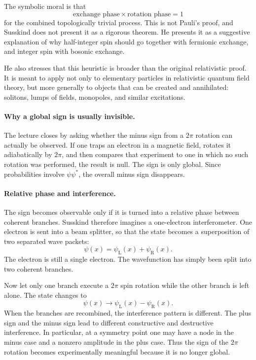 The symbolic moral is that
\begin{equation}
\text{exchange phase} \times \text{rotation phase} = 1
\end{equation}
for the combined topologically trivial process. This is not Pauli's proof, and Susskind does not present it as a rigorous theorem. He presents it as a suggestive explanation of why half-integer spin should go together with fermionic exchange, and integer spin with bosonic exchange.

He also stresses that this heuristic is broader than the original relativistic proof. It is meant to apply not only to elementary particles in relativistic quantum field theory, but more generally to objects that can be created and annihilated: solitons, lumps of fields, monopoles, and similar excitations.

\paragraph{Why a global sign is usually invisible.}

The lecture closes by asking whether the minus sign from a \(2\pi\) rotation can actually be observed. If one traps an electron in a magnetic field, rotates it adiabatically by \(2\pi\), and then compares that experiment to one in which no such rotation was performed, the result is null. The sign is only global. Since probabilities involve \(\psi\psi^\ast\), the overall minus sign disappears.

\paragraph{Relative phase and interference.}

The sign becomes observable only if it is turned into a relative phase between coherent branches. Susskind therefore imagines a one-electron interferometer. One electron is sent into a beam splitter, so that the state becomes a superposition of two separated wave packets:
\begin{equation}
\psi(x)=\psi_{\mathrm{L}}(x)+\psi_{\mathrm{R}}(x).
\end{equation}
The electron is still a single electron. The wavefunction has simply been split into two coherent branches.

Now let only one branch execute a \(2\pi\) spin rotation while the other branch is left alone. The state changes to
\begin{equation}
\psi(x)\longrightarrow \psi_{\mathrm{L}}(x)-\psi_{\mathrm{R}}(x).
\end{equation}
When the branches are recombined, the interference pattern is different. The plus sign and the minus sign lead to different constructive and destructive interference. In particular, at a symmetry point one may have a node in the minus case and a nonzero amplitude in the plus case. Thus the sign of the \(2\pi\) rotation becomes experimentally meaningful because it is no longer global.


